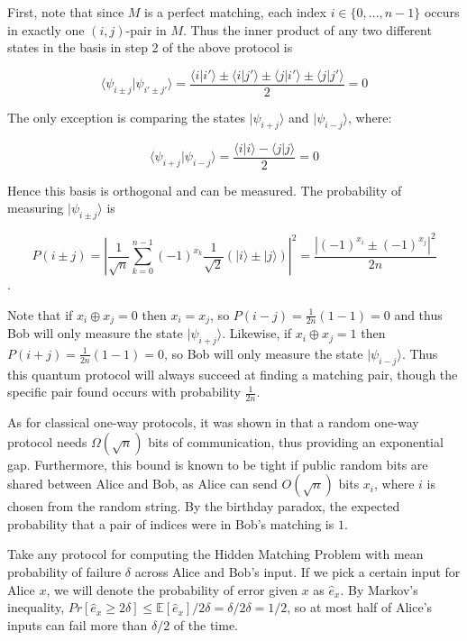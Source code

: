 \documentclass[a4paper]{article}
\begin{document}
        First, note that since $M$ is a perfect matching, each index $i \in \{0,...,n-1\}$ occurs in exactly one $(i, j)$-pair in $M$. Thus the inner product of any two different states in the basis in step 2 of the above protocol is

        $$\langle\psi_{i\pm j}|\psi_{i'\pm j'}\rangle = \frac{\langle i|i'\rangle \pm \langle i|j'\rangle \pm \langle j|i'\rangle \pm \langle j|j'\rangle}{2} = 0$$

        The only exception is comparing the states $|\psi_{i + j}\rangle$ and $|\psi_{i - j}\rangle$, where:

        $$\langle\psi_{i + j}|\psi_{i - j}\rangle = \frac{\langle i|i\rangle - \langle j|j\rangle}{2} = 0$$

        Hence this basis is orthogonal and can be measured. The probability of measuring $|\psi_{i \pm j}\rangle$ is

        $$P(i\pm j) = \left|\frac{1}{\sqrt{n}}\sum_{k=0}^{n-1}(-1)^{x_k}\frac{1}{\sqrt{2}}(|i\rangle \pm |j\rangle)\right|^2 = \frac{|(-1)^{x_i} \pm (-1)^{x_j}|^2}{2n}$$.

        Note that if $x_i \oplus x_j = 0$ then $x_i = x_j$, so $P(i-j) = \frac{1}{2n}(1-1) = 0$ and thus Bob will only measure the state $|\psi_{i+j}\rangle$. Likewise, if $x_i \oplus x_j = 1$ then $P(i+j) = \frac{1}{2n}(1-1) = 0$, so Bob will only measure the state $|\psi_{i-j}\rangle$. Thus this quantum protocol will always succeed at finding a matching pair, though the specific pair found occurs with probability $\frac{1}{2n}$.

        As for classical one-way protocols, it was shown in \cite{doi:10.1137/060651835} that a random one-way protocol needs $\Omega(\sqrt{n})$ bits of communication, thus providing an exponential gap. Furthermore, this bound is known to be tight if public random bits are shared between Alice and Bob, as Alice can send $O(\sqrt{n})$ bits $x_i$, where $i$ is chosen from the random string. By the birthday paradox, the expected probability that a pair of indices were in Bob's matching is $1$.

        Take any protocol for computing the Hidden Matching Problem with mean probability of failure $\delta$ across Alice and Bob's input. If we pick a certain input for Alice $x$, we will denote the probability of error given $x$ as $\hat{e}_x$. By Markov's inequality, $Pr[\hat{e}_x \geq 2\delta] \leq \mathbb{E}[\hat{e}_x]/2\delta = \delta/2\delta = 1/2$, so at most half of Alice's inputs can fail more than $\delta/2$ of the time.
\end{document}
